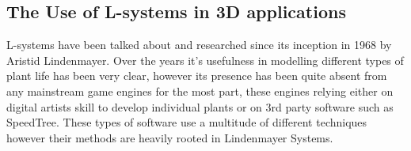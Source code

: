 \FloatBarrier

\subsection{The Use of L-systems in 3D applications}

\begin{flushleft}

L-systems have been talked about and researched since its inception in 1968 by Aristid Lindenmayer. Over the years it's usefulness in modelling different types of plant life has been very clear, however its presence has been quite absent from any mainstream game engines for the most part, these engines relying either on digital artists skill to develop individual plants or on 3rd party software such as SpeedTree. These types of software use a multitude of different techniques however their methods are heavily rooted in Lindenmayer Systems. 

\end{flushleft}

